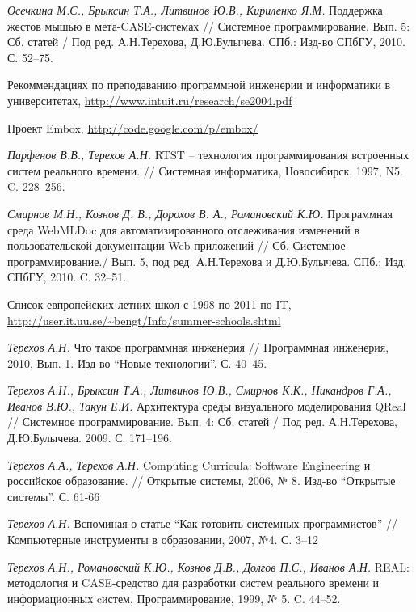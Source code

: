 \documentclass[a4paper]{article}
\begin{document}
\begin{thebibliography}{9001}
  \emph{Осечкина М.С., Брыксин Т.А., Литвинов Ю.В., Кириленко Я.М.} Поддержка жестов мышью в мета-CASE-системах // Системное программирование. Вып. 5: Сб. статей / Под ред. А.Н.Терехова, Д.Ю.Булычева.  СПб.: Изд-во СПбГУ, 2010. С. 52--75.

   Рекоммендациях по преподаванию программной инженерии и информатики в университетах, \url{http://www.intuit.ru/research/se2004.pdf}  

   Проект Embox, \url{http://code.google.com/p/embox/}

   \emph{Парфенов В.В., Терехов А.Н.} RTST -- технология программирования встроенных систем реального времени. // Системная информатика, Новосибирск, 1997, N5. C. 228--256.
  
  \emph{Смирнов М.Н., Кознов Д. В., Дорохов В. А., Романовский К.Ю.} Программная среда WebMLDoc для автоматизированного отслеживания изменений в пользовательской документации Web-приложений // Сб. Системное программирование./ Вып. 5, под ред. А.Н.Терехова и Д.Ю.Булычева. СПб.: Изд. СПбГУ, 2010. C. 32--51.
  
   Список  евпропейских летних школ с 1998 по 2011 по IT, \url{http://user.it.uu.se/~bengt/Info/summer-schools.shtml}

  \emph{Терехов А.Н.} Что такое программная инженерия // Программная инженерия, 2010, Вып. 1. Изд-во ``Новые технологии''. С. 40--45.

   \emph{Терехов А.Н., Брыксин Т.А., Литвинов Ю.В., Смирнов К.К., Никандров  Г.А., Иванов В.Ю., Такун Е.И.} Архитектура среды визуального  моделирования QReal // Системное программирование. Вып. 4: Сб. статей  / Под ред. А.Н.Терехова, Д.Ю.Булычева. 2009. С. 171--196.

  \emph{Терехов А.А., Терехов А.Н.} Computing Curricula: Software Engineering и российское образование. // Открытые системы, 2006, № 8. Изд-во ``Открытые системы''. С. 61-66

  \emph{Терехов А.Н.} Вспоминая о статье ``Как готовить системных программистов'' // Компьютерные инструменты в образовании, 2007, №4. С. 3--12

   \emph{Терехов А.Н., Романовский К.Ю., Кознов Д.В., Долгов П.С., Иванов А.Н.} REAL: методология и CASE-средство для разработки систем реального времени и информационных cистем, Программирование, 1999, № 5. C. 44--52.


\end{thebibliography}
\end{document}
